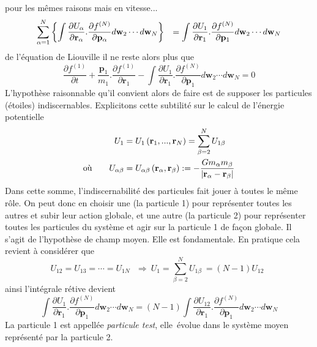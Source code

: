 {pour les m\^{e}mes raisons mais en vitesse... }
\[%
\begin{array}
[c]{ll}%
\displaystyle\sum\limits_{\alpha=1}^{N}\left\{  \displaystyle\int%
\dfrac{\partial U_{\alpha}}{\partial\mathbf{r}_{\alpha}}.\dfrac{\partial
f^{(N)}}{\partial\mathbf{p}_{\alpha}}d\mathbf{w}_{2}\cdots d\mathbf{w}%
_{N}\right\}   & =\displaystyle\int\dfrac{\partial U_{1}}{\partial
\mathbf{r}_{1}}.\dfrac{\partial f^{(N)}}{\partial\mathbf{p}_{1}}%
d\mathbf{w}_{2}\cdots d\mathbf{w}_{N}%
\end{array}
\]
{de l'\'{e}quation de {Liouville} il ne reste alors plus que }
\[
\frac{\partial f^{(1)}}{\partial t}+\dfrac{\mathbf{p}_{1}}{m_{1}}%
.\dfrac{\partial f^{(1)}}{\partial\mathbf{r}_{1}}-\displaystyle\int%
\dfrac{\partial U_{1}}{\partial\mathbf{r}_{1}}.\dfrac{\partial f^{(N)}%
}{\partial\mathbf{p}_{1}}d\mathbf{w}_{2}\cdots d\mathbf{w}_{N}=0
\]
{L'hypoth\`{e}se raisonnable qu'il convient alors de faire est de supposer les
particules (\'{e}toiles) indiscernables. Explicitons cette subtilit\'{e} sur
le calcul de l'\'{e}nergie potentielle}
\begin{align*}
U_{1} &  =U_{1}\left(  \mathbf{r}_{1},...,\mathbf{r}_{N}\right)  =\sum
_{\beta=2}^{N}U_{1\beta}\\
\text{o\`{u}\qquad}U_{\alpha\beta} &  =U_{\alpha\beta}\left(  \mathbf{r}%
_{\alpha},\mathbf{r}_{\beta}\right)  :=-\frac{Gm_{\alpha}m_{\beta}}{\left\vert
\mathbf{r}_{\alpha}-\mathbf{r}_{\beta}\right\vert }%
\end{align*}
Dans cette somme, l'indiscernabilit\'{e} des particules fait jouer \`{a}
toutes le m\^{e}me r\^{o}le. On peut donc en choisir une (la particule 1) pour
repr\'{e}senter toutes les autres et subir leur action globale, et une autre
(la particule 2) pour repr\'{e}senter toutes les particules du syst\`{e}me et
agir sur la particule 1 {de fa\c{c}on globale. Il s'agit de l'hypoth\`{e}se de
champ moyen. Elle est fondamentale. En pratique cela revient \`{a}
consid\'{e}rer que }%
\[
U_{12}=U_{13}=\cdots=U_{1N}\ \ \ \Rightarrow\ U_{1}=\sum_{\beta=2}%
^{N}U_{1\beta}\ =\left(  N-1\right)  U_{12}\ \
\]
ainsi l'int\'{e}grale r\'{e}tive devient{\ }
\[
\displaystyle\int\dfrac{\partial U_{1}}{\partial\mathbf{r}_{1}}.\dfrac
{\partial f^{(N)}}{\partial\mathbf{p}_{1}}d\mathbf{w}_{2}\cdots d\mathbf{w}%
_{N}=\left(  N-1\right)  \displaystyle\int\dfrac{\partial U_{12}}%
{\partial\mathbf{r}_{1}}.\dfrac{\partial f^{(N)}}{\partial\mathbf{p}_{1}%
}d\mathbf{w}_{2}\cdots d\mathbf{w}_{N}%
\]
La particule 1 est appell\'{e}e \og\emph{particule test}\fg, elle\ \'{e}volue
dans le syst\`{e}me {moyen} repr\'{e}sent\'{e} par la particule 2$.$

